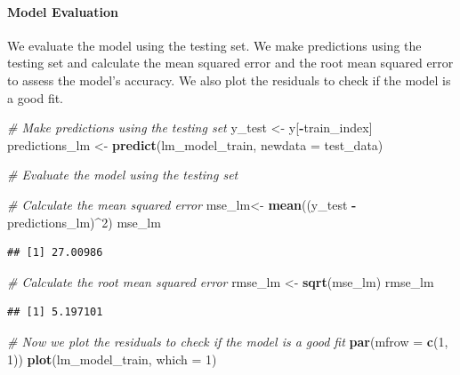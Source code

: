 \documentclass[
]{article}
\newenvironment{Shaded}{\begin{snugshade}}{\end{snugshade}}
\newcommand{\AttributeTok}[1]{\textcolor[rgb]{0.13,0.29,0.53}{#1}}
\newcommand{\CommentTok}[1]{\textcolor[rgb]{0.56,0.35,0.01}{\textit{#1}}}
\newcommand{\DecValTok}[1]{\textcolor[rgb]{0.00,0.00,0.81}{#1}}
\newcommand{\FunctionTok}[1]{\textcolor[rgb]{0.13,0.29,0.53}{\textbf{#1}}}
\newcommand{\NormalTok}[1]{#1}
\newcommand{\OtherTok}[1]{\textcolor[rgb]{0.56,0.35,0.01}{#1}}
\newcommand{\SpecialCharTok}[1]{\textcolor[rgb]{0.81,0.36,0.00}{\textbf{#1}}}
\begin{document}
\paragraph{Model Evaluation}\label{model-evaluation}

We evaluate the model using the testing set. We make predictions using
the testing set and calculate the mean squared error and the root mean
squared error to assess the model's accuracy. We also plot the residuals
to check if the model is a good fit.

\begin{Shaded}
\begin{Highlighting}[]
\CommentTok{\# Make predictions using the testing set}
\NormalTok{y\_test }\OtherTok{\textless{}{-}}\NormalTok{ y[}\SpecialCharTok{{-}}\NormalTok{train\_index]}
\NormalTok{predictions\_lm }\OtherTok{\textless{}{-}} \FunctionTok{predict}\NormalTok{(lm\_model\_train, }\AttributeTok{newdata =}\NormalTok{ test\_data)}

\CommentTok{\# Evaluate the model using the testing set}

\CommentTok{\# Calculate the mean squared error}
\NormalTok{mse\_lm}\OtherTok{\textless{}{-}} \FunctionTok{mean}\NormalTok{((y\_test }\SpecialCharTok{{-}}\NormalTok{ predictions\_lm)}\SpecialCharTok{\^{}}\DecValTok{2}\NormalTok{)}
\NormalTok{mse\_lm}
\end{Highlighting}
\end{Shaded}

\begin{verbatim}
## [1] 27.00986
\end{verbatim}

\begin{Shaded}
\begin{Highlighting}[]
\CommentTok{\# Calculate the root mean squared error}
\NormalTok{rmse\_lm }\OtherTok{\textless{}{-}} \FunctionTok{sqrt}\NormalTok{(mse\_lm)}
\NormalTok{rmse\_lm}
\end{Highlighting}
\end{Shaded}

\begin{verbatim}
## [1] 5.197101
\end{verbatim}

\begin{Shaded}
\begin{Highlighting}[]
\CommentTok{\# Now we plot the residuals to check if the model is a good fit}
\FunctionTok{par}\NormalTok{(}\AttributeTok{mfrow =} \FunctionTok{c}\NormalTok{(}\DecValTok{1}\NormalTok{, }\DecValTok{1}\NormalTok{))}
\FunctionTok{plot}\NormalTok{(lm\_model\_train, }\AttributeTok{which =} \DecValTok{1}\NormalTok{)}
\end{Highlighting}
\end{Shaded}
\end{document}
